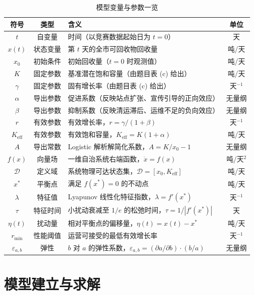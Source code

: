 \documentclass[12pt,a4paper]{ctexart}
\begin{document}
\begin{table}[H]
\centering


\begin{tabular}{cclc}
\toprule
符号 & 类型 & 含义 & 单位 \\
\midrule
$t$      & 自变量 & 时间（以竞赛数据起始日为 $t=0$） & 天 \\
$x(t)$   & 状态变量 & 第 $t$ 天的全市可回收物回收量 & 吨/天 \\
$x_0$    & 初始条件 & 初始回收量（$t=0$ 时观测值） & 吨/天 \\
$K$      & 固定参数 & 基准潜在饱和容量（由题目表 (c) 给出） & 吨/天 \\
$\gamma$ & 固定参数 & 固有增长率（由题目表 (c) 给出） & 天$^{-1}$ \\
$\alpha$  & 导出参数 & 促进系数（反映站点扩张、宣传引导的正向效应） & 无量纲 \\
$\beta$   & 导出参数 & 抑制系数（反映清运滞后、运维不足的负向效应） & 无量纲 \\
$r$      & 有效参数 & 有效增长率，$r = \gamma/(1+\beta)$ & 天$^{-1}$ \\
$K_{\text{eff}}$ & 有效参数 & 有效饱和容量，$K_{\text{eff}} = K(1+\alpha)$ & 吨/天 \\
$A$      & 导出常数 & Logistic 解析解简化系数，$A = K/x_0 - 1$ & 无量纲 \\
$f(x)$   & 向量场 & 一维自治系统右端函数，$\dot{x}=f(x)$ & 吨/天$^2$ \\
$\mathcal{D}$ & 定义域 & 系统物理可达状态集，$\mathcal{D}=[x_0, K_{\text{eff}}]$ & 吨/天 \\
$x^*$    & 平衡点 & 满足 $f(x^*)=0$ 的不动点 & 吨/天 \\
$\lambda$ & 特征值 & Lyapunov 线性化特征指数，$\lambda=f'(x^*)$ & 天$^{-1}$ \\
$\tau$    & 特征时间 & 小扰动衰减至 $1/e$ 的松弛时间，$\tau=1/|f'(x^*)|$ & 天 \\
$\eta(t)$ & 扰动量 & 相对平衡点的偏移量，$\eta(t)=x(t)-x^*$ & 吨/天 \\
$r_{\min}$ & 性能阈值 & 运营可接受的最低有效增长率 & 天$^{-1}$ \\
$\varepsilon_{a,b}$ & 弹性 & $b$ 对 $a$ 的弹性系数，$\varepsilon_{a,b} = (\partial a/\partial b) \cdot (b/a)$ & 无量纲 \\
\bottomrule
\end{tabular}
\caption{模型变量与参数一览}
\label{tab:symbols}

\end{table}

\section{模型建立与求解}
\end{document}
